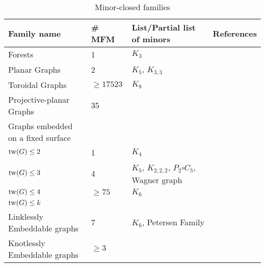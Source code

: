 \begin{table}[h!]
    
    \centering
    \caption{Minor-closed families}\label{tab:minor-closed families}
    \begin{tabular*}{\textwidth}{@{}llll@{}}
    \toprule
    Family name                  & \# MFM & List/Partial list of minors                      & References \\ \midrule
    Forests                      & 1                                  & $K_3$                                            &            \\
    Planar Graphs                & 2                                  & $K_5$, $K_{3,3}$                                 & \tablefootnote{\textcite{wagnerUeberEigenschaftEbenen1937}}           \\
    Toroidal Graphs              & $\geq 17523$                       & $K_8$                                            & \tablefootnote{\textcite{myrvoldLargeSetTorus2018}}           \\
    Projective-planar Graphs     & 35                                 &                                   & \tablefootnote{\textcite{archdeaconKuratowskiTheoremProjective1980}}           \\
    Graphs embedded on a fixed surface & & &\\
    $\operatorname{tw}(G) \leq 2$              & 1                                  & $K_4$                                            &            \\
    $\operatorname{tw}(G) \leq 3$              & 4                                  & $K_5$, $K_{2,2,2}$, $P_2 \square C_5$, Wagner graph & \tablefootnote{\textcite{arnborgForbiddenMinorsCharacterization1990}}           \\
    $\operatorname{tw}(G) \leq 4$              & $\geq 75$                          & $K_6$                                            & \tablefootnote{\textcite{sandersLinearAlgorithmsGraphs1993}}           \\
    $\operatorname{tw}(G) \leq k$              &                                    &                                                  &            \\
    Linklessly Embeddable graphs & 7                                  & $K_6$, Petersen Family                           & \tablefootnote{\textcite{robertsonLinklessEmbeddingsGraphs1993}} \\
    Knotlessly Embeddable graphs & $\geq 3$                           &                                                  & \tablefootnote{\textcite{conwayKnotsLinksSpatial1983,foisyIntrinsicallyKnottedGraphs2002,foisyNewlyRecognizedIntrinsically2003}}\\
    \bottomrule
    \end{tabular*}
    
\end{table}
